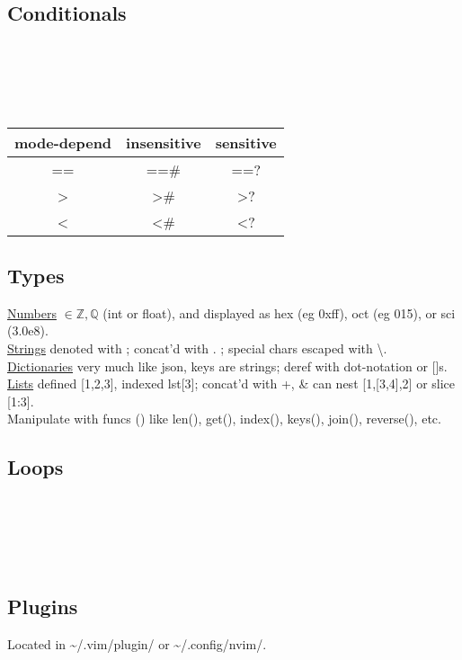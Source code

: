 \subsection*{Conditionals}

\\
\\
\\
\\

\begin{tabular}{c c c}
    mode-depend & insensitive & sensitive \\
    \hline
    == & ==\# & ==? \\
    > & >\# & >? \\
    < & <\# & <?
\end{tabular}


\subsection*{Types}

\underline{Numbers} $\in {\mathbb{Z}, \mathbb{Q}}$ (int or float), and displayed as hex (eg 0xff), oct (eg 015), or sci (3.0e8).\\
\underline{Strings} denoted with \textquotedbl \hspace{1pt}; concat'd with . ; special chars escaped with \textbackslash. \\
\underline{Dictionaries} very much like json, keys are strings; deref with dot-notation or []s.\\
\underline{Lists} defined [1,2,3], indexed lst[3]; concat'd with +, \& can nest [1,[3,4],2] or slice [1:3].\\
Manipulate with funcs () like len(), get(), index(), keys(), join(), reverse(), etc.


\subsection*{Loops}

\\
\\
\\
\\

\subsection*{Plugins}
Located in \textasciitilde /.vim/plugin/ or \textasciitilde/.config/nvim/.\\

